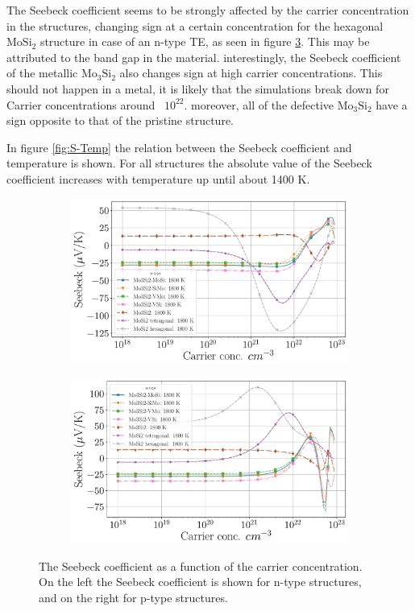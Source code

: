 \documentclass[12pt]{article}
\theoremstyle{plain}
\theoremstyle{definition}
\newcommand{\<}{\langle}
\renewcommand{\>}{\rangle}
\begin{document}
The Seebeck coefficient seems to be strongly affected by the carrier concentration in the structures, changing sign at a certain concentration for the hexagonal $\text{Mo}\text{Si}_2$ structure in case of an n-type TE, as seen in figure \ref{fig:S-Doping}. This may be attributed to the band gap in the material. 
interestingly, the Seebeck coefficient of the metallic $\text{Mo}_{3}\text{Si}_{2}$ also changes sign at high carrier concentrations. This should not happen in a metal, it is likely that the simulations break down for Carrier concentrations around ~$10^{22}$. moreover, all of the defective $\text{Mo}_{3}\text{Si}_{2}$ have a sign opposite to that of the pristine structure.

In figure \ref{fig:S-Temp} the relation between the Seebeck coefficient and temperature is shown. For all structures the absolute value of the Seebeck coefficient increases with temperature up until about 1400 K. 


\begin{figure}[b!]
\centering
\begin{subfigure}{.5\textwidth}
  \centering
  \includegraphics[width=\linewidth]{allmats_S_doping_temp_n}
  \caption{}
  \label{fig:sub1}
\end{subfigure}%
\begin{subfigure}{.5\textwidth}
  \centering
  \includegraphics[width=\linewidth]{allmats_S_doping_temp_p}
  \caption{}
  \label{fig:sub2}
\end{subfigure}
\caption{The Seebeck coefficient as a function of the carrier concentration. On the left the Seebeck coefficient is shown for n-type structures, and on the right for p-type structures.}
\label{fig:S-Doping}
\end{figure}
\end{document}
